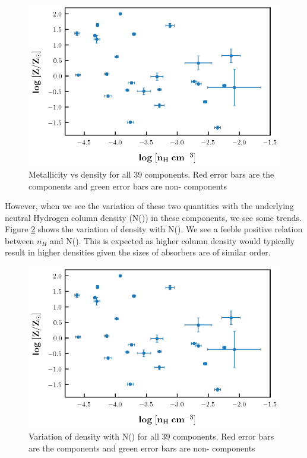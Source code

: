 \begin{figure}
    \centering
    \includegraphics[width=\linewidth]{Figures/Z_vs_nH.png}
    \caption{Metallicity vs density for all 39 components. Red error bars are the  components and green error bars are non- components}
    \label{fig:nH-Z}
\end{figure}

However, when we see the variation of these two quantities with the underlying neutral Hydrogen column density (N()) in these components, we see some trends. Figure \ref{fig:nH-NHi} shows the variation of density with N(). We see a feeble positive relation between $n_H$ and N(). This is expected as higher column density would typically result in higher densities given the sizes of absorbers are of similar order. 

\begin{figure}
    \centering
    \includegraphics[width=\linewidth]{Figures/Z_vs_nH.png}
    \caption{Variation of density with N() for all 39 components. Red error bars are the  components and green error bars are non- components}
    \label{fig:nH-NHi}
\end{figure}

